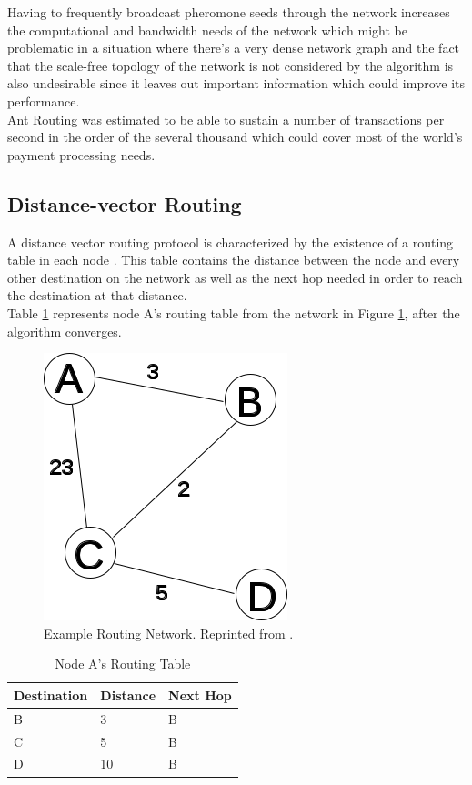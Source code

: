 Having to frequently broadcast pheromone seeds through the network increases the computational and bandwidth needs of the network which might be problematic in a situation where there's a very dense network graph and the fact that the scale-free topology of the network is not considered by the algorithm is also undesirable since it leaves out important information which could improve its performance. \\
Ant Routing was estimated to be able to sustain a number of transactions per second in the order of the several thousand \cite{ant_routing_scalability} which could cover most of the world's payment processing needs.

\subsection{Distance-vector Routing}
\label{ssec:distancevectorrouting}

A distance vector routing protocol is characterized by the existence of a routing table in each node \cite{distance_vector}. This table contains the distance between the node and every other destination on the network as well as the next hop needed in order to reach the destination at that distance. \\
Table \ref{table:dv_routing_table_a} represents node A's routing table from the network in Figure \ref{fig:dv_networkabcd}, after the algorithm converges.

\begin{figure}[H]
\begin{center}
  \includegraphics[width=0.4\linewidth]{images/networkabcd.png}
  \caption{Example Routing Network. Reprinted from \cite{distance_vector}.}
  \label{fig:dv_networkabcd}
  \end{center}
\end{figure}

\begin{table}[H]
\centering
\begin{tabular}{|l|l|l|}
\hline
\rowcolor[HTML]{C0C0C0} 
Destination & Distance & Next Hop \\ \hline
B           & 3    & B        \\ \hline
C           & 5    & B        \\ \hline
D           & 10   & B        \\ \hline
\end{tabular}
\caption{Node A's Routing Table}
\label{table:dv_routing_table_a}
\end{table}

